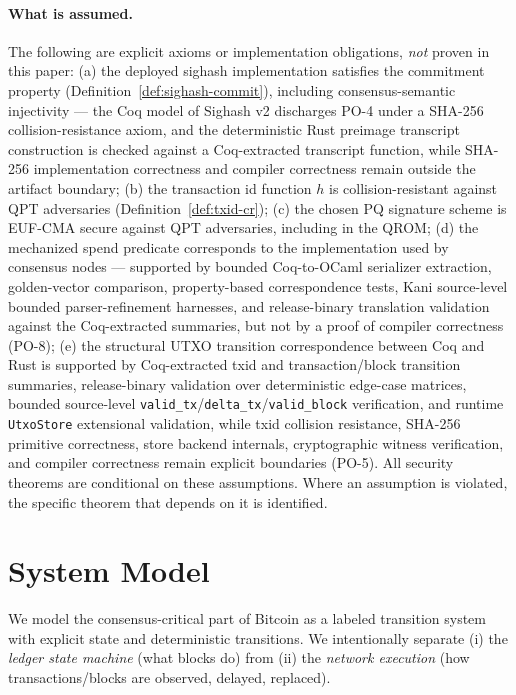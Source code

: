 \documentclass[11pt]{article}
\begin{document}
\paragraph{What is assumed.}
The following are explicit axioms or implementation obligations, \emph{not} proven in this paper:
(a) the deployed sighash implementation satisfies the commitment property (Definition~\ref{def:sighash-commit}), including consensus-semantic injectivity --- the Coq model of Sighash v2 discharges PO-4 under a SHA-256 collision-resistance axiom, and the deterministic Rust preimage transcript construction is checked against a Coq-extracted transcript function, while SHA-256 implementation correctness and compiler correctness remain outside the artifact boundary;
(b) the transaction id function $h$ is collision-resistant against QPT adversaries (Definition~\ref{def:txid-cr});
(c) the chosen PQ signature scheme is EUF-CMA secure against QPT adversaries, including in the QROM;
(d) the mechanized spend predicate corresponds to the implementation used by consensus nodes --- supported by bounded Coq-to-OCaml serializer extraction, golden-vector comparison, property-based correspondence tests, Kani source-level bounded parser-refinement harnesses, and release-binary translation validation against the Coq-extracted summaries, but not by a proof of compiler correctness (PO-8);
(e) the structural UTXO transition correspondence between Coq and Rust is supported by Coq-extracted txid and transaction/block transition summaries, release-binary validation over deterministic edge-case matrices, bounded source-level \texttt{valid\_tx}/\texttt{delta\_tx}/\texttt{valid\_block} verification, and runtime \texttt{UtxoStore} extensional validation, while txid collision resistance, SHA-256 primitive correctness, store backend internals, cryptographic witness verification, and compiler correctness remain explicit boundaries (PO-5).
All security theorems are conditional on these assumptions.
Where an assumption is violated, the specific theorem that depends on it is identified.

\section{System Model}\label{sec:model}

We model the consensus-critical part of Bitcoin as a labeled transition system with explicit state and deterministic transitions.
We intentionally separate (i) the \emph{ledger state machine} (what blocks do) from (ii) the \emph{network execution} (how transactions/blocks are observed, delayed, replaced).
\end{document}
